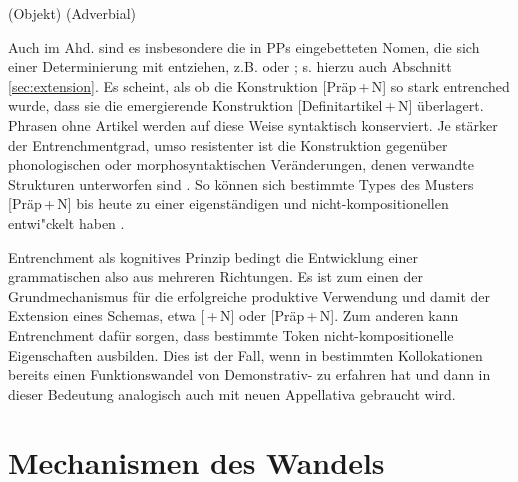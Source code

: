 \begin{exe}
	\ex \label{ex:fuss}
	\begin{xlist}
		\ex \label{ex:denfuss}  (Objekt)  
		\ex \label{ex:zufuss}  (Adverbial) 
	\end{xlist}
\end{exe}

Auch im Ahd. sind es insbesondere die in PPs eingebetteten Nomen, die sich einer Determinierung mit  entziehen, z.B.   oder   \parencite[84]{Oubouzar1992}; s. hierzu auch Abschnitt \ref{sec:extension}. Es scheint, als ob die Konstruktion   [Präp\,+\,N] so stark entrenched wurde, dass sie die emergierende Konstruktion  [Definitartikel\,+\,N] überlagert. Phrasen ohne Artikel werden auf diese Weise syntaktisch konserviert. Je stärker der Entrenchmentgrad, umso resistenter ist die Konstruktion   gegenüber phonologischen oder morphosyntaktischen Veränderungen, denen verwandte Strukturen unterworfen sind \parencite[715]{Bybee2006}. So können sich bestimmte Types des Musters [Präp\,+\,N] bis heute zu einer eigenständigen und nicht-kompositionellen  entwi"ckelt haben \parencite[343--344]{Himmelmann1998}. 

Entrenchment als kognitives Prinzip bedingt die Entwicklung einer grammatischen   also aus mehreren Richtungen. Es ist zum einen der Grundmechanismus für die erfolgreiche produktive Verwendung und damit der Extension eines Schemas, etwa [\,+\,N] oder [Präp\,+\,N]. Zum anderen kann Entrenchment dafür sorgen, dass bestimmte Token nicht-kompositionelle Eigenschaften ausbilden. Dies ist der Fall, wenn  in bestimmten Kollokationen bereits einen Funktionswandel von Demonstrativ-  zu  erfahren hat und dann in dieser Bedeutung analogisch  auch mit neuen Appellativa gebraucht wird. 


\section{Mechanismen des Wandels}\label{sec:mechanismen}

